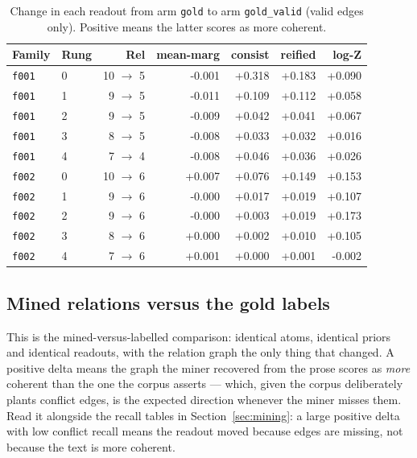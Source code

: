 \documentclass[11pt]{article}
\begin{document}
\begin{table}[htbp]
\centering
\small
\caption{Change in each readout from arm \texttt{gold} to arm \texttt{gold\_valid} (valid edges only). Positive means the latter scores as more coherent.}
\label{tab:arm-delta-gold-gold-valid}
\begin{tabular}{llrrrrr}
\toprule
Family & Rung & Rel & \textbf{mean-marg} & \textbf{consist} & \textbf{reified} & \textbf{log-Z} \\
\midrule
\texttt{f001} & 0 & 10 $\to$ 5 & -0.001 & +0.318 & +0.183 & +0.090 \\
\texttt{f001} & 1 & 9 $\to$ 5 & -0.011 & +0.109 & +0.112 & +0.058 \\
\texttt{f001} & 2 & 9 $\to$ 5 & -0.009 & +0.042 & +0.041 & +0.067 \\
\texttt{f001} & 3 & 8 $\to$ 5 & -0.008 & +0.033 & +0.032 & +0.016 \\
\texttt{f001} & 4 & 7 $\to$ 4 & -0.008 & +0.046 & +0.036 & +0.026 \\
\texttt{f002} & 0 & 10 $\to$ 6 & +0.007 & +0.076 & +0.149 & +0.153 \\
\texttt{f002} & 1 & 9 $\to$ 6 & -0.000 & +0.017 & +0.019 & +0.107 \\
\texttt{f002} & 2 & 9 $\to$ 6 & -0.000 & +0.003 & +0.019 & +0.173 \\
\texttt{f002} & 3 & 8 $\to$ 6 & +0.000 & +0.002 & +0.010 & +0.105 \\
\texttt{f002} & 4 & 7 $\to$ 6 & +0.001 & +0.000 & +0.001 & -0.002 \\
\bottomrule
\end{tabular}
\end{table}

\subsection{Mined relations versus the gold labels}

This is the mined-versus-labelled comparison: identical atoms, identical priors and identical readouts, with the relation graph the only thing that changed. A positive delta means the graph the miner recovered from the prose scores as \emph{more} coherent than the one the corpus asserts --- which, given the corpus deliberately plants conflict edges, is the expected direction whenever the miner misses them. Read it alongside the recall tables in Section~\ref{sec:mining}: a large positive delta with low conflict recall means the readout moved because edges are missing, not because the text is more coherent.
\end{document}
